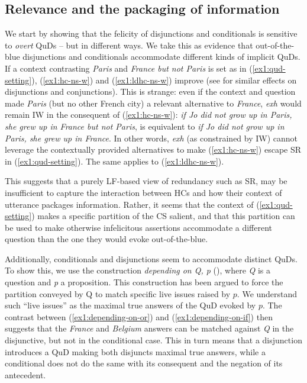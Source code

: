 \subsection{Relevance and the packaging of information}
We start by showing that the felicity of disjunctions and conditionals is sensitive to \textit{overt} QuDs -- but in different ways. We take this as evidence that out-of-the-blue disjunctions and conditionals accommodate different kinds of implicit QuDs.\\

If a context contrasting \textit{Paris} and \textit{France but not Paris} is set as in (\ref{ex1:qud-setting}), (\ref{ex1:hc-ns-w}) and (\ref{ex1:ldhc-ns-w}) improve (see \cite{Haslinger2023} for similar effects on disjunctions and conjunctions). This is strange: even if the context and question made \textit{Paris} (but no other French city) a relevant alternative to \textit{France}, \textit{exh} would remain IW in the consequent of (\ref{ex1:hc-ns-w}): \textit{if Jo did not grow up in Paris, she grew up in France but not Paris}, is equivalent to \textit{if Jo did not grow up in Paris, she grew up in France}. In other words, \textit{exh} (as constrained by IW) cannot leverage the contextually provided alternatives to make (\ref{ex1:hc-ns-w}) escape SR in (\ref{ex1:qud-setting}). The same applies to (\ref{ex1:ldhc-ns-w}).


\begin{exe}
	\label{ex1:qud-setting}
\end{exe}


This suggests that a purely LF-based view of redundancy such as SR, may be insufficient to capture the interaction between HCs and how their context of utterance packages information. Rather, it seems that the context of (\ref{ex1:qud-setting}) makes a specific partition of the CS salient, and that this partition can be used to make otherwise infelicitous assertions accommodate a different question than the one they would evoke out-of-the-blue.

Additionally, conditionals and disjunctions seem to accommodate distinct QuDs. To show this, we use the construction \textit{depending on Q, p} (\cite{Karttunen1977,Kaufmann2016}), where \textit{Q} is a question and \textit{p} a proposition. This construction has been argued to force the partition conveyed by Q to match specific live issues raised by $p$. We understand such ``live issues'' as the maximal true answers of the QuD evoked by $p$. The contrast between (\ref{ex1:depending-on-or}) and (\ref{ex1:depending-on-if}) then suggests that the \textit{France} and \textit{Belgium} answers can be matched against \textit{Q} in the disjunctive, but not in the conditional case. This in turn means that a disjunction introduces a QuD making both disjuncts maximal true answers, while a conditional does not do the same with its consequent and the negation of its antecedent.

